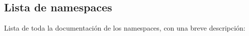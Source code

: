 \subsection{Lista de \textquotesingle{}namespaces\textquotesingle{}}
Lista de toda la documentación de los \textquotesingle{}namespaces\textquotesingle{}, con una breve descripción\+:\begin{DoxyCompactList}
\item{}
\end{DoxyCompactList}
